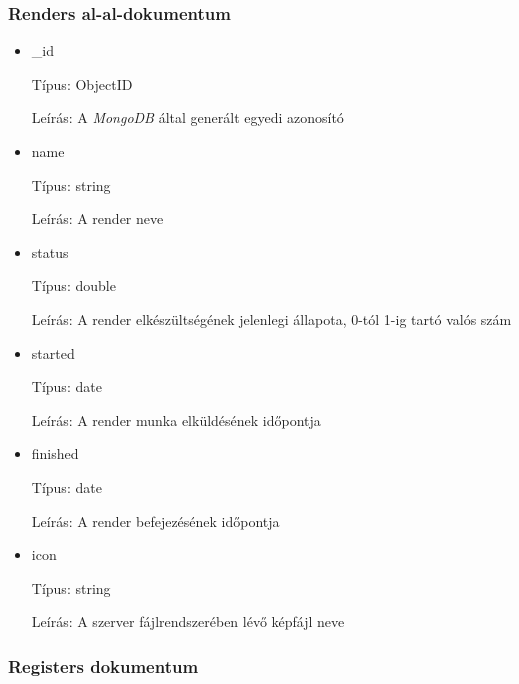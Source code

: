 \subsubsection{Renders al-al-dokumentum}

\begin{itemize}
  \item \_id

        Típus: ObjectID

        Leírás: A \emph{MongoDB} által generált egyedi azonosító
  \item name

        Típus: string

        Leírás: A render neve
  \item status

        Típus: double

        Leírás: A render elkészültségének jelenlegi állapota, 0-tól 1-ig tartó valós szám
  \item started

        Típus: date

        Leírás: A render munka elküldésének időpontja
  \item finished

        Típus: date

        Leírás: A render befejezésének időpontja
  \item icon

        Típus: string

        Leírás: A szerver fájlrendszerében lévő képfájl neve
\end{itemize}

\subsubsection{Registers dokumentum}

